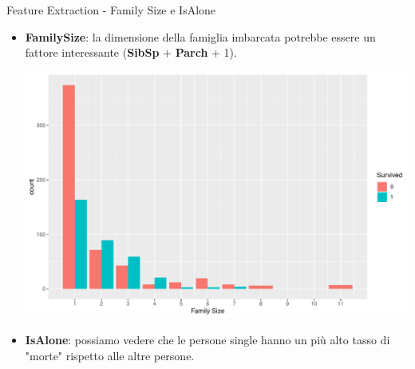\documentclass[9pt, xcolor=table]{beamer}
\begin{document}
	\begin{frame}{Feature Extraction - Family Size e IsAlone}
		\begin{itemize}
			\item \textbf{FamilySize}: la dimensione della famiglia imbarcata potrebbe
			essere un fattore interessante (\textbf{SibSp} + \textbf{Parch} + 1).
			
			\centering
			\includegraphics[scale=0.38]{barplot-familysize}
			
			\item \textbf{IsAlone}: possiamo vedere che le persone single hanno un più alto tasso di "morte" rispetto alle altre persone.
		\end{itemize}
	\end{frame}
\end{document}

